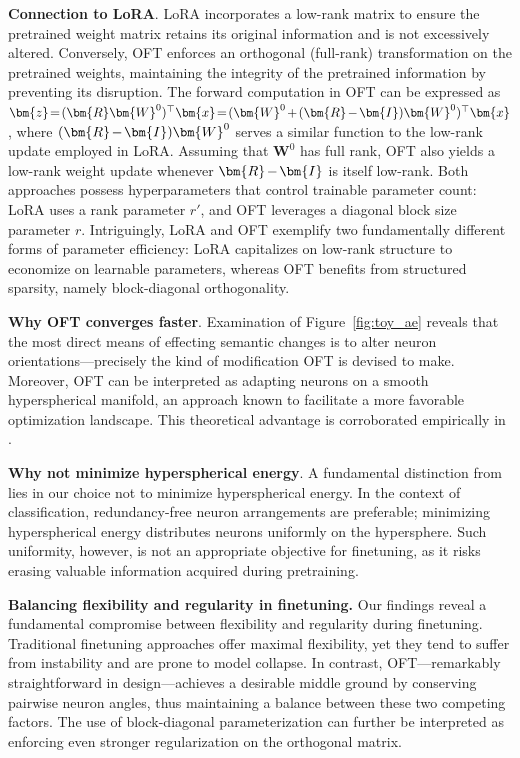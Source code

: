 {\textbf{Connection to LoRA}. LoRA incorporates a low-rank matrix to ensure the pretrained weight matrix retains its original information and is not excessively altered. Conversely, OFT enforces an orthogonal (full-rank) transformation on the pretrained weights, maintaining the integrity of the pretrained information by preventing its disruption. The forward computation in OFT can be expressed as $\thickmuskip=2mu \medmuskip=2mu \bm{z}=(\bm{R}\bm{W}^0)^\top\bm{x}=(\bm{W}^0+(\bm{R}-\bm{I})\bm{W}^0)^\top\bm{x}$, where $\thickmuskip=2mu \medmuskip=2mu (\bm{R}-\bm{I})\bm{W}^0$ serves a similar function to the low-rank update employed in LoRA. Assuming that $\bm{W}^0$ has full rank, OFT also yields a low-rank weight update whenever $\thickmuskip=2mu \medmuskip=2mu \bm{R}-\bm{I}$ is itself low-rank. Both approaches possess hyperparameters that control trainable parameter count: LoRA uses a rank parameter $r'$, and OFT leverages a diagonal block size parameter $r$. Intriguingly, LoRA and OFT exemplify two fundamentally different forms of parameter efficiency: LoRA capitalizes on low-rank structure to economize on learnable parameters, whereas OFT benefits from structured sparsity, namely block-diagonal orthogonality.

\textbf{Why OFT converges faster}. Examination of Figure~\ref{fig:toy_ae} reveals that the most direct means of effecting semantic changes is to alter neuron orientations—precisely the kind of modification OFT is devised to make. Moreover, OFT can be interpreted as adapting neurons on a smooth hyperspherical manifold, an approach known to facilitate a more favorable optimization landscape. This theoretical advantage is corroborated empirically in \cite{liu2021orthogonal}.

\textbf{Why not minimize hyperspherical energy}. A fundamental distinction from \cite{liu2021orthogonal} lies in our choice not to minimize hyperspherical energy. In the context of classification, redundancy-free neuron arrangements are preferable; minimizing hyperspherical energy distributes neurons uniformly on the hypersphere. Such uniformity, however, is not an appropriate objective for finetuning, as it risks erasing valuable information acquired during pretraining.

\textbf{Balancing flexibility and regularity in finetuning.} Our findings reveal a fundamental compromise between flexibility and regularity during finetuning. Traditional finetuning approaches offer maximal flexibility, yet they tend to suffer from instability and are prone to model collapse. In contrast, OFT—remarkably straightforward in design—achieves a desirable middle ground by conserving pairwise neuron angles, thus maintaining a balance between these two competing factors. The use of block-diagonal parameterization can further be interpreted as enforcing even stronger regularization on the orthogonal matrix.

}

